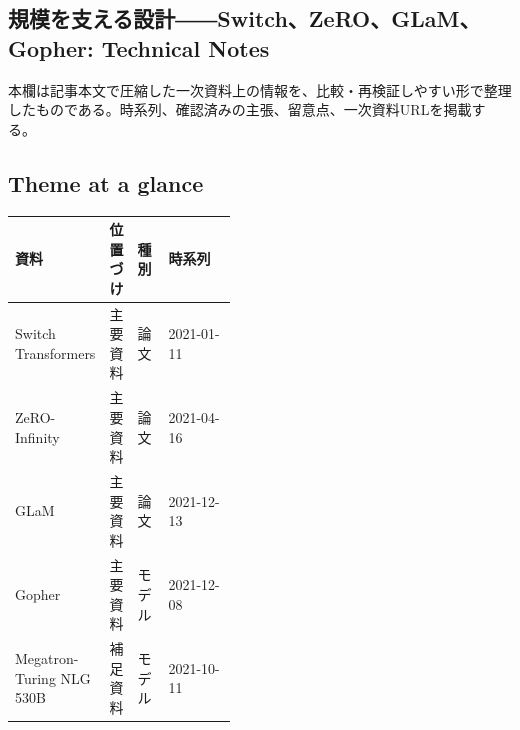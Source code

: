 \subsection*{規模を支える設計――Switch、ZeRO、GLaM、Gopher: Technical Notes}
本欄は記事本文で圧縮した一次資料上の情報を、比較・再検証しやすい形で整理したものである。時系列、確認済みの主張、留意点、一次資料URLを掲載する。
\smallskip
{}\par
\medskip
\subsection*{Theme at a glance}
\begin{center}
\footnotesize
\begin{tabularx}{\linewidth}{@{}p{0.20\linewidth}p{0.10\linewidth}p{0.14\linewidth}X@{}}
\toprule
資料 & 位置づけ & 種別 & 時系列 \\
\midrule
Switch Transformers & 主要資料 & 論文 & 2021-01-11 \\
ZeRO-Infinity & 主要資料 & 論文 & 2021-04-16 \\
GLaM & 主要資料 & 論文 & 2021-12-13 \\
Gopher & 主要資料 & モデル & 2021-12-08 \\
Megatron-Turing NLG 530B & 補足資料 & モデル & 2021-10-11 \\
\bottomrule
\end{tabularx}
\end{center}
\normalsize

